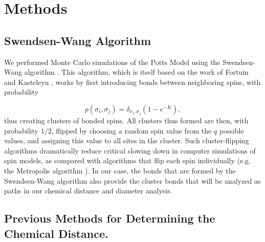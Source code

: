\documentclass[pre,preprint,11pt]{revtex4}
\begin{document}

\section{Methods}
\subsection{ Swendsen-Wang Algorithm}

We performed Monte Carlo simulations of the Potts Model using the Swendsen-Wang algorithm \cite{SwWa}. This algorithm, which is itself based on the work of Fortuin and Kasteleyn \cite{FoKa}, works by first introducing bonds between neighboring spins, with probability 

\begin{equation}
p(\sigma_i,\sigma_j) = \delta_{\sigma_i, \sigma_j} (1-e^{-K}),
\end{equation}  
thus creating clusters of bonded spins.   All clusters thus formed are then, with probability $1/2$, flipped by choosing a random spin value from the $q$ possible values, and assigning this value to all sites in the cluster.  Such cluster-flipping algorithms dramatically reduce critical slowing down in computer simulations of spin models, as compared with algorithms that flip each spin individually \cite{NeBa99} (e.g. the Metropolis algorithm \cite{Met}).  In our case, the  bonds that are formed by the Swendsen-Wang algorithm also provide the cluster bonds that will be analyzed as paths in our chemical distance and diameter analysis.


\subsection{ Previous Methods for Determining the Chemical Distance.}
\end{document}
